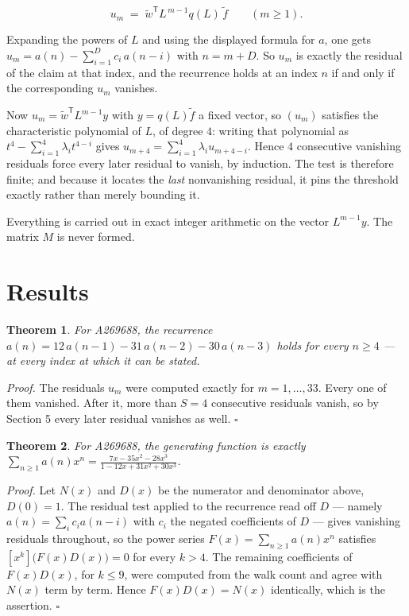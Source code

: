 \documentclass[11pt]{article}
\newtheorem{theorem}{Theorem}
\theoremstyle{definition}
\begin{document}
\[u_m \;=\; \tilde w^{\mathsf T} L^{\,m-1} q(L)\,\tilde f \qquad (m \ge 1).\]

Expanding the powers of $L$ and using the displayed formula for $a$, one gets $u_m = a(n) - \sum_{i=1}^{D} c_i\,a(n-i)$ with $n = m + D$. So $u_m$ is exactly the residual of the claim at that index, and the recurrence holds at an index $n$ if and only if the corresponding $u_m$ vanishes.

Now $u_m = \tilde w^{\mathsf T} L^{m-1} y$ with $y = q(L)\tilde f$ a fixed vector, so $(u_m)$ satisfies the characteristic polynomial of $L$, of degree $4$: writing that polynomial as $t^{4} - \sum_{i=1}^{4} \lambda_i t^{4-i}$ gives $u_{m+4} = \sum_{i=1}^{4} \lambda_i u_{m+4-i}$. Hence $4$ consecutive vanishing residuals force every later residual to vanish, by induction. The test is therefore finite; and because it locates the {\itshape last} nonvanishing residual, it pins the threshold exactly rather than merely bounding it.

Everything is carried out in exact integer arithmetic on the vector $L^{m-1}y$. The matrix $M$ is never formed.

\section{Results}

\begin{theorem} For A269688, the recurrence $a(n) = 12\,a(n-1) - 31\,a(n-2) - 30\,a(n-3)$ holds for every $n \ge 4$ --- at every index at which it can be stated.\end{theorem}

{\itshape Proof.} The residuals $u_m$ were computed exactly for $m = 1,\dots,33$. Every one of them vanished. After it, more than $S = 4$ consecutive residuals vanish, so by Section 5 every later residual vanishes as well. $\square$

\begin{theorem} For A269688, the generating function is exactly $\sum_{n\ge 1} a(n)x^n = \frac{7x - 35x^{2} - 28x^{3}}{1 - 12x + 31x^{2} + 30x^{3}}$.\end{theorem}

{\itshape Proof.} Let $N(x)$ and $D(x)$ be the numerator and denominator above, $D(0)=1$. The residual test applied to the recurrence read off $D$ --- namely $a(n) = \sum_i c_i a(n-i)$ with $c_i$ the negated coefficients of $D$ --- gives vanishing residuals throughout, so the power series $F(x)=\sum_{n\ge 1}a(n)x^n$ satisfies $[x^k]\bigl(F(x)D(x)\bigr) = 0$ for every $k > 4$. The remaining coefficients of $F(x)D(x)$, for $k \le 9$, were computed from the walk count and agree with $N(x)$ term by term. Hence $F(x)D(x) = N(x)$ identically, which is the assertion. $\square$
\end{document}
